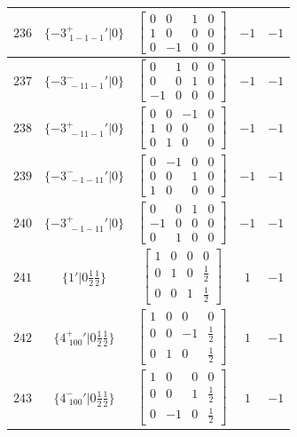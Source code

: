 \documentclass[fleqn,8pt]{jsarticle}
\begin{document}
\begin{longtable}{ccccc}
$ 236 $ & $ \{-3^{+}_{\,\,1-1-1}{}'|0\} $ & $ \begin{bmatrix} 0 & 0 & 1 & 0 \\ 1 & 0 & 0 & 0 \\ 0 & -1 & 0 & 0 \end{bmatrix} $ & $ -1 $ & $ -1 $ \\ \hline
$ 237 $ & $ \{-3^{-}_{\,\,-11-1}{}'|0\} $ & $ \begin{bmatrix} 0 & 1 & 0 & 0 \\ 0 & 0 & 1 & 0 \\ -1 & 0 & 0 & 0 \end{bmatrix} $ & $ -1 $ & $ -1 $ \\ \hline
$ 238 $ & $ \{-3^{+}_{\,\,-11-1}{}'|0\} $ & $ \begin{bmatrix} 0 & 0 & -1 & 0 \\ 1 & 0 & 0 & 0 \\ 0 & 1 & 0 & 0 \end{bmatrix} $ & $ -1 $ & $ -1 $ \\ \hline
$ 239 $ & $ \{-3^{-}_{\,\,-1-11}{}'|0\} $ & $ \begin{bmatrix} 0 & -1 & 0 & 0 \\ 0 & 0 & 1 & 0 \\ 1 & 0 & 0 & 0 \end{bmatrix} $ & $ -1 $ & $ -1 $ \\ \hline
$ 240 $ & $ \{-3^{+}_{\,\,-1-11}{}'|0\} $ & $ \begin{bmatrix} 0 & 0 & 1 & 0 \\ -1 & 0 & 0 & 0 \\ 0 & 1 & 0 & 0 \end{bmatrix} $ & $ -1 $ & $ -1 $ \\ \hline
$ 241 $ & $ \{1{}'|0 \frac{1}{2} \frac{1}{2}\} $ & $ \begin{bmatrix} 1 & 0 & 0 & 0 \\ 0 & 1 & 0 & \frac{1}{2} \\ 0 & 0 & 1 & \frac{1}{2} \end{bmatrix} $ & $ 1 $ & $ -1 $ \\ \hline
$ 242 $ & $ \{4^{+}_{\,\,100}{}'|0 \frac{1}{2} \frac{1}{2}\} $ & $ \begin{bmatrix} 1 & 0 & 0 & 0 \\ 0 & 0 & -1 & \frac{1}{2} \\ 0 & 1 & 0 & \frac{1}{2} \end{bmatrix} $ & $ 1 $ & $ -1 $ \\ \hline
$ 243 $ & $ \{4^{-}_{\,\,100}{}'|0 \frac{1}{2} \frac{1}{2}\} $ & $ \begin{bmatrix} 1 & 0 & 0 & 0 \\ 0 & 0 & 1 & \frac{1}{2} \\ 0 & -1 & 0 & \frac{1}{2} \end{bmatrix} $ & $ 1 $ & $ -1 $ \\ \hline

\end{longtable}
\end{document}
